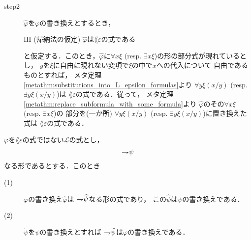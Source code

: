 \begin{metaprf}
\begin{description}
			\item[step2] $\widehat{\varphi}$を$\varphi$の書き換えとするとき，
				\begin{itembox}[l]{IH (帰納法の仮定)}
					$\widehat{\varphi}$は$\lang{\varepsilon}$の式である
				\end{itembox}
				と仮定する．このとき，$\widehat{\varphi}$に$\forall x \xi$ 
				(resp. $\exists x \xi$)の形の部分式が現れているとし，
				$y$を$\xi$に自由に現れない変項で$\xi$の中で$x$への代入について
				自由であるものとすれば，
				メタ定理\ref{metathm:substitutions_into_L_epsilon_formulas}より
				$\forall y \xi(x/y)$ (resp. $\exists y \xi(x/y)$)は
				$\lang{\varepsilon}$の式である．従って，
				メタ定理\ref{metathm:replace_subformula_with_some_formula}より
				$\widehat{\varphi}$のその$\forall x \xi$ (resp. $\exists x \xi$)の
				部分を(一か所)
				$\forall y \xi(x/y)$ (resp. $\exists y \xi(x/y)$)に置き換えた式は
				$\lang{\varepsilon}$の式である．
				\QED
		\end{description}
	\end{metaprf}
	
	\begin{screen}
		\begin{metathm}[部分式の書き換えとの関係1]
		\label{metathm:relation_to_subformula_rewriting}
		\label{metathm:relation_to_subformula_rewriting_1}
			$\varphi$を$\lang{\varepsilon}$の式ではない$\mathcal{L}$の式とし，
			\begin{align}
				\rightharpoondown\hspace{-0.25em} \psi
			\end{align}
			なる形であるとする．このとき
			\begin{description}
				\item[(1)] $\varphi$の書き換え$\widehat{\varphi}$は
					$\rightharpoondown\hspace{-0.25em} \widehat{\psi}$なる形の式であり，
					この$\widehat{\psi}$は$\psi$の書き換えである．
					
				\item[(2)] $\check{\psi}$を$\psi$の書き換えとすれば
					$\rightharpoondown\hspace{-0.25em} \check{\psi}$は$\varphi$の書き換えである．
			\end{description}
		\end{metathm}
	\end{screen}
	
